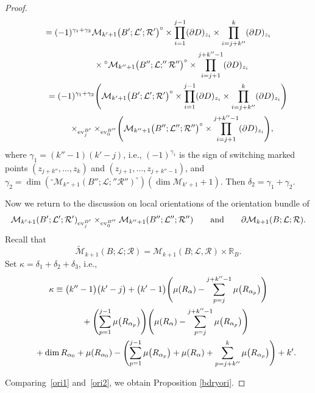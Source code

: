 \documentclass[pdftex]{sigma}
\numberwithin{equation}{section}
\theoremstyle{definition}
\begin{document}
\begin{proof}
\begin{gather*}
 =  (-1)^{\gamma_1+ \gamma_2 } {\mathcal M}_{k'+1}\bigl(B';{\mathcal L}';{\mathcal R}'\bigr)^{\circ} \times \prod_{i=1}^{j-1}(\partial D)_{z_i} \times
\prod_{i=j+k''}^k (\partial D)_{z_i}  \\ \quad\qquad{}
  \times {}^{\circ}{\mathcal M}_{k''+1}\bigl(B'';{\mathcal L};''{\mathcal R}''\bigr)^{\circ} \times \prod_{i=j+1}^{j+k''-1}(\partial D)_{z_i}  \\ \qquad{}
 =  (-1)^{\gamma_1 + \gamma_2} \Biggl( {\mathcal M}_{k'+1}\bigl(B';{\mathcal L}';{\mathcal R}'\bigr)^{\circ} \times \prod_{i=1}^{j-1}(\partial D)_{z_i} \times\prod_{i=j+k''}^k (\partial D)_{z_i} \Biggr)  \\ \quad\qquad{}
 {}\times _{{\rm ev}_j^{B'}} \times_{{\rm ev}_0^{B''}} \Biggl( {\mathcal M}_{k''+1}\bigl(B'';{\mathcal L}'';{\mathcal R}''\bigr)^{\circ} \times \prod_{i=j+1}^{j+k''-1}(\partial D)_{z_i} \Biggr),
\end{gather*}
where $\gamma_1 = (k''-1) (k' -j)$, i.e., $(-1)^{\gamma_1}$ is the sign of switching marked points $(z_{j+k''}, \dots, z_k)$ and $(z_{j+1}, \dots, z_{j+k''-1})$, and
$\gamma_2 = \dim ( {}^{\circ}{\mathcal M}_{k''+1}(B'';{\mathcal L};''{\mathcal R}'')^{\circ} ) ( \dim {\mathcal M}_{k'+1} +1 )$.
Then $\delta_2 = \gamma_1 + \gamma_2$.

Now we return to the discussion on local orientations of the orientation bundle of
\[
{\mathcal M}_{k'+1}(B';{\mathcal L}';{\mathcal R}')_{{\rm ev}_j^{B'}} \times_{{\rm ev}_0^{B''}} {\mathcal M}_{k''+1}(B'';{\mathcal L}'';{\mathcal R}'')
\qquad
\text{and} \qquad
\partial {\mathcal M}_{k+1}(B;{\mathcal L}; {\mathcal R}).
\]
Recall that
\begin{equation}\label{ori2}
\widetilde{\mathcal M}_{k+1}(B;{\mathcal L};{\mathcal R})={\mathcal M}_{k+1}(B;{\mathcal L}, {\mathcal R}) \times {\mathbb R}_B.
\end{equation}
Set $\kappa = \delta_1 + \delta_2 + \delta_3$, i.e.,
\begin{gather*}
\kappa \equiv \bigl(k''-1\bigr) \bigl(k'-j\bigr) +\bigl(k'-1\bigr) \Biggl( \mu(R_{\alpha}) - \sum_{p=j}^{j+k''-1} \mu\bigl(R_{\alpha_p}\bigr) \Biggr) \\ \hphantom{\kappa \equiv}{}
 + \Biggl( \sum_{p=1}^{j-1}\mu\bigl(R_{\alpha_p}\bigr) \Biggr)
\Biggl(\mu(R_{\alpha}) - \sum_{p=j}^{j+k''-1} \mu\bigl(R_{\alpha_p}\bigr) \Biggr)
 \\ \hphantom{\kappa \equiv}{}
 + \dim R_{\alpha_0} + \mu(R_{\alpha_0}) - \Biggl( \sum_{p=1}^{j-1} \mu\bigl(R_{\alpha_p}\bigr) + \mu(R_{\alpha}) + \sum_{p=j+k''}^k \mu \bigl(R_{\alpha_p}\bigr) \Biggr) +k'.
\end{gather*}

Comparing~\eqref{ori1} and~\eqref{ori2}, we obtain Proposition \ref{bdryori}.
\end{proof}
\end{document}
